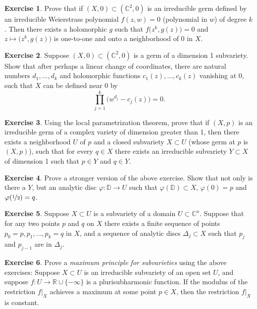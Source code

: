 \documentclass[12pt,openany]{book}
\newcommand{\C}{{\mathbb{C}}}
\newcommand{\R}{{\mathbb{R}}}
\newcommand{\D}{{\mathbb{D}}}
\theoremstyle{plain}
\theoremstyle{remark}
\theoremstyle{definition}
\newenvironment{exbox}{%
    \def\FrameCommand{\vrule width 1pt \relax\hspace {10pt}}%
    \MakeFramed {\advance \hsize -\width \FrameRestore }%
}{%
    \endMakeFramed
}
\theoremstyle{exercise}
\newtheorem{exercise}{Exercise}[section]
\theoremstyle{example}
\begin{document}
\begin{exbox}
\begin{exercise}
Prove that if $(X,0) \subset (\C^2,0)$ is an irreducible germ defined
by an irreducible Weierstrass polynomial $f(z,w) = 0$ (polynomial in $w$)
of degree $k$.  Then there exists a holomorphic $g$ such that
$f\bigl(z^k,g(z)\bigr) = 0$ and $z \mapsto \bigl(z^k,g(z)\bigr)$
is one-to-one and onto a neighborhood of 0 in $X$.
\end{exercise}

\begin{exercise}
Suppose $(X,0) \subset (\C^2,0)$ is a germ of a dimension 1 subvariety.
Show that after perhaps a linear change of coordinates,
there are natural numbers
$d_1,\ldots,d_k$
and
holomorphic functions $c_1(z),\ldots,c_k(z)$ vanishing at $0$,
such that $X$ can be defined near 0 by
\begin{equation*}
\prod_{j=1}^k {\bigl( w^{d_j} - c_j(z) \bigr)} = 0.
\end{equation*}
\end{exercise}

\begin{exercise}
Using the local parametrization theorem, prove that
if $(X,p)$ is an irreducible germ of a complex variety of dimension greater
than 1, then there exists a neighborhood $U$ of $p$ and a closed subvariety
$X \subset U$ (whose germ at $p$ is $(X,p)$), such that for every
$q \in X$ there exists an irreducible subvariety $Y \subset X$
of dimension 1 such that $p \in Y$ and $q \in Y$.
\pagebreak[2]
\end{exercise}

\begin{exercise}
Prove a stronger version of the above exercise.  Show that not only is there
a $Y$, but an analytic disc $\varphi \colon \D \to U$ such that
$\varphi(\D) \subset X$, $\varphi(0) = p$ and $\varphi(\nicefrac{1}{2}) =
q$.
\end{exercise}

\begin{exercise}
Suppose $X \subset U$ is a subvariety of a domain $U \subset \C^n$.
Suppose that for any two points $p$ and $q$ on $X$ there exists a finite sequence
of points $p_0 = p, p_1, \ldots, p_k = q$ in $X$, and a sequence of analytic discs
$\Delta_j \subset X$ such that $p_{j}$ and $p_{j-1}$ are in $\Delta_j$.
\end{exercise}

\begin{exercise}\label{exercise:maxprincsubvar}
Prove a \emph{maximum principle for subvarieties} using the above exercises:
Suppose $X \subset U$ is an irreducible subvariety of an open set $U$,
and suppose $f \colon U \to \R \cup \{ - \infty \}$
is a plurisubharmonic function.  If the modulus of the restriction $f|_X$
achieves a maximum
at some point $p \in X$, then the restriction $f|_X$ is constant.
\end{exercise}


\end{exbox}
\end{document}
